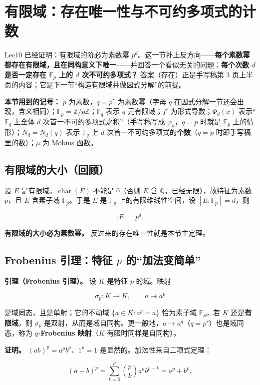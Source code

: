 \section{有限域：存在唯一性与不可约多项式的计数}


Lec10 已经证明：有限域的阶必为素数幂 $p^d$。这一节补上反方向——\textbf{每个素数幂都存在有限域，且在同构意义下唯一}——并回答一个看似无关的问题：\textbf{每个次数 $d$ 是否一定存在 $\mathbb F_p$ 上的 $d$ 次不可约多项式？} 答案（存在）正是手写稿第 3 页上半页的内容；它是下一节“构造有限域并做因式分解”的前提。

\textbf{本节用到的记号：} $p$ 为素数，$q=p^r$ 为素数幂（字母 $q$ 在因式分解一节还会出现，含义相同）；$\mathbb F_p=\mathbb Z/p\mathbb Z$；$\mathbb F_q$ 表示 $q$ 元有限域；$f'$ 为形式导数；$\Phi_d(x)$ 表示“$\mathbb F_q$ 上全体 $d$ 次首一不可约多项式之积”（手写稿写成 $\varphi_d$，$q=p$ 时就是 $\mathbb F_p$ 上的情形）；$N_d=N_d(q)$ 表示 $\mathbb F_q$ 上 $d$ 次首一不可约多项式的\textbf{个数}（$q=p$ 时即手写稿里的数）；$\mu$ 为 Möbius 函数。

\subsection{有限域的大小（回顾）}


设 $E$ 是有限域。$\operatorname{char}(E)$ 不能是 $0$（否则 $E$ 含 $\mathbb Q$，已经无限），故特征为素数 $p$，且 $E$ 含素子域 $\mathbb F_p$。于是 $E$ 是 $\mathbb F_p$ 上的有限维线性空间，设 $[E:\mathbb F_p]=d$，则

\[
|E|=p^d .
\]

\textbf{有限域的大小必为素数幂。} 反过来的存在唯一性就是本节主定理。

\subsection{Frobenius 引理：特征 $p$ 的“加法变简单”}


\textbf{引理（Frobenius 引理）。} 设 $K$ 是特征 $p$ 的域。映射

\[
\sigma_p:K\longrightarrow K,\qquad a\longmapsto a^p
\]

是域同态，且是单射；它的不动域 $\{a\in K:a^p=a\}$ 恰为素子域 $\mathbb F_p$。若 $K$ 还是\textbf{有限域}，则 $\sigma_p$ 是双射，从而是域自同构。更一般地，$a\mapsto a^{q}$（$q=p^r$）也是域同态，称为 \textbf{$q$-Frobenius 映射}（$K$ 有限时同样是自同构）。

\textbf{证明。} $(ab)^p=a^pb^p$、$1^p=1$ 是显然的。加法性来自二项式定理：

\[
(a+b)^p=\sum_{k=0}^{p}\binom{p}{k}a^k b^{p-k}=a^p+b^p,
\]

